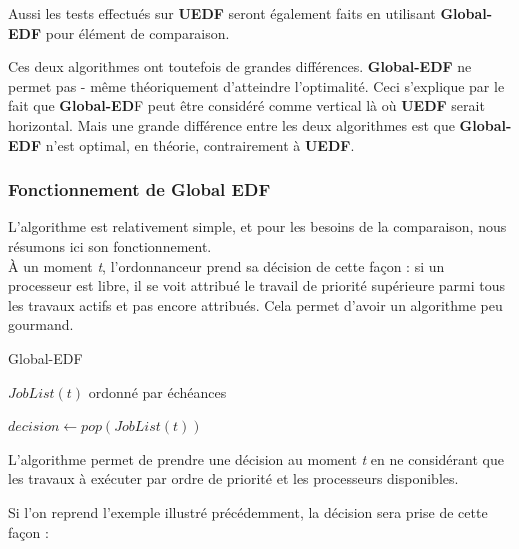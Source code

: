 	Aussi les tests effectués sur \textbf{UEDF} seront également faits en utilisant \textbf{Global-EDF} pour 
	élément de comparaison.\newline
	
	Ces deux algorithmes ont toutefois de grandes différences. \textbf{Global-EDF}
	ne permet pas - même théoriquement  d'atteindre l'optimalité. Ceci s'explique par le fait que 
	\textbf{Global-ED}F peut être considéré comme \og{}vertical\fg{} là où \textbf{UEDF} serait \og{}horizontal\fg{}. 
	Mais une grande différence entre les deux algorithmes est que \textbf{Global-EDF} n'est optimal, 
	en théorie, contrairement à \textbf{UEDF}.
	
	\subsubsection{Fonctionnement de Global EDF}
	
	L'algorithme est relativement simple, et pour les besoins de la comparaison, nous résumons 
	ici son fonctionnement.\\
	À un moment \textit{t}, l'ordonnanceur prend sa décision de cette façon :
	si un processeur est libre, il se voit attribué le travail de priorité supérieure parmi 
	tous les travaux actifs et pas encore attribués. Cela permet d'avoir un algorithme peu gourmand.
	
	\begin{algorithm}
	\caption{Global-EDF}
	\begin{algorithmic}
		\REQUIRE $JobList(t)$ ordonné par échéances
			\item $decision \leftarrow pop(JobList(t))$
		\ENDFOR
	\end{algorithmic}
\end{algorithm}	
	
	L'algorithme permet de prendre une décision au moment \textit{t} en ne considérant 
	que les travaux à exécuter par ordre de priorité et les processeurs disponibles.
	
	Si l'on reprend l'exemple illustré précédemment, la décision sera prise de cette façon :
	
